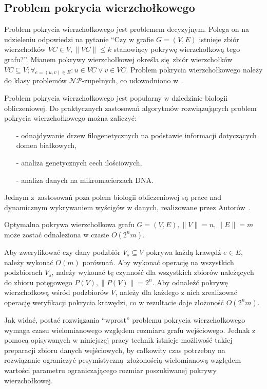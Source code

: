 \subsection{Problem pokrycia wierzchołkowego}\label{s_vertex_cover_domain}
\par{
  Problem pokrycia wierzchołkowego jest problemem decyzyjnym.
  Polega on na udzieleniu odpowiedzi na pytanie ``Czy w grafie $G=(V,E)$
  istnieje zbiór wierzchołków $VC \in V, \|VC\| \leq k$ stanowiący pokrywę 
  wierzchołkową tego grafu?''.
  Mianem pokrywy wierzchołkowej określa się zbiór wierzchołków $VC
  \subseteq V; \forall_{e=(u,v) \in E}:u\in VC\lor v\in VC$.
  Problem pokrycia wierzchołkowego należy do klasy problemów 
  $\mathcal{NP}$-zupełnych, co udowodniono w~\cite{Kar72}.
}
\par{
  Problem pokrycia wierzchołkowego jest popularny w dziedzinie biologii
  obliczeniowej. 
  Do praktycznych zastosowań algorytmów rozwiązujących problem pokrycia
  wierzchołkowego można zaliczyć:
  \begin{itemize}
    \item[-] odnajdywanie drzew filogenetycznych na podstawie informacji
      dotyczących domen białkowych,
    \item[-] analiza genetycznych cech ilościowych,
    \item[-] analiza danych na mikromacierzach DNA.\@
  \end{itemize}

  Jednym z~zastosowań poza polem biologii obliczeniowej są prace nad dynamicznym
  wykrywaniem wyścigów w danych, realizowane przez 
  Autorów~\cite{O'Callahan:2003:HDD:781498.781528}.
}
\begin{theorem}
  Optymalna pokrywa wierzchołkowa grafu $G=(V,E), \|V\|=n, \|E\|=m$ może zostać 
  odnaleziona w czasie $O(2^{n}m)$.
\end{theorem}
\begin{bproof}
  Aby zweryfikować czy dany podzbiór $V_s \subseteq V$ pokrywa każdą krawędź
  $e \in E$, należy wykonać $O(m)$ porównań.
  Aby wykonać operację na wszystkich podzbiorach $V_s$, należy wykonać tę
  czynność dla wszystkich zbiorów należących do zbioru potęgowego 
  $P(V), \|P(V)\| = 2^{n}$.
  Aby odnaleźć pokrywę wierzchołkową wśród podzbiorów $V$, należy dla każdego z
  nich zrealizować operację weryfikacji pokrycia krawędzi, co w rezultacie daje 
  złożoność $O(2^{n}m)$.
\end{bproof}
\par{
  Jak widać, postać rozwiązania ``wprost'' problemu pokrycia wierzchołkowego
  wymaga czasu wielomianowego względem rozmiaru grafu wejściowego.
  Jednak z pomocą opisywanych w niniejszej pracy technik istnieje możliwość
  takiej preparacji zbioru danych wejściowych, by całkowity czas potrzebny na
  rozwiązanie ograniczyć pesymistyczną~złożonością wielomianową względem
  wartości parametru ograniczającego rozmiar poszukiwanej pokrywy
  wierzchołkowej.
}
